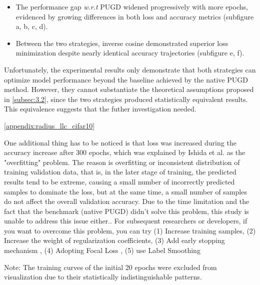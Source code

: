\documentclass[10pt,twocolumn,letterpaper]{article}
\begin{document}
\begin{itemize}
    \item The performance gap \textit{w.r.t} PUGD widened progressively with more epochs, evidenced by growing differences in both loss and accuracy metrics  (subfigure a, b, c, d).
    \item Between the two strategies, inverse cosine demonstrated superior loss minimization despite nearly identical accuracy trajectories (subfigure e, f).
\end{itemize}
Unfortunately, the experimental results only demonstrate that both strategies can optimize model performance beyond the baseline achieved by the native PUGD method. However, they cannot substantiate the theoretical assumptions proposed in \cref{subsec:3.2}, since the two strategies produced statistically equivalent results. This equivalence suggests that the futher investigation needed.
 
\cref{appendix:radius_llc_cifar10}

One additional thing has to be noticed is that loss was increased during the accuracy increase after 300 epochs, which was explained by Ishida et al. \cite{ishida2021needzerotrainingloss} as the "overfitting" problem. The reason is overfitting or inconsistent distribution of training validation data, that is, in the later stage of training, the predicted results tend to be extreme, causing a small number of incorrectly predicted samples to dominate the loss, but at the same time, a small number of samples do not affect the overall validation accuracy. Due to the time limitation and the fact that the benchmark (native PUGD) didn't solve this problem, this study is unable to address this issue either.. For subsequent researchers or developers, if you want to overcome this problem, you can try (1) Increase training samples, (2) Increase the weight of regularization coefficients, (3) Add early stopping mechanism \cite{bai2021understandingimprovingearlystopping}, (4) Adopting Focal Loss \cite{lin2018focallossdenseobject}, (5) use Label Smoothing \cite{szegedy2015rethinkinginceptionarchitecturecomputer}

Note: The training curves of the initial 20 epochs were excluded from visualization due to their statistically indistinguishable patterns.
\end{document}
